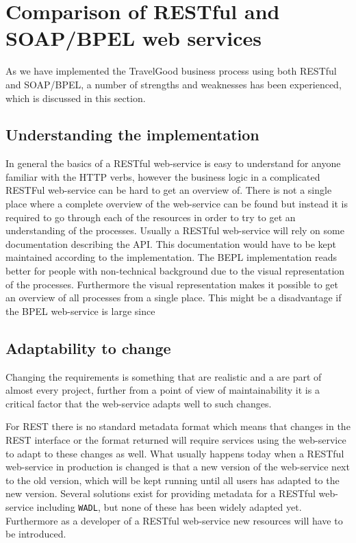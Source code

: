 {\setlength{\chapterfontsize}{26pt}
\chapter{Comparison of RESTful and SOAP/BPEL web services}
}

As we have implemented the TravelGood business process using both RESTful and SOAP/BPEL, a number of strengths and weaknesses has been experienced, which is discussed in this section. 


\section{Understanding the implementation}
In general the basics of a RESTful web-service is easy to understand for anyone familiar with the HTTP verbs, however the business logic in a complicated RESTFul web-service can be hard to get an overview of. There is not a single place where a complete overview of the web-service can be found but instead it is required to go through each of the resources in order to try to get an understanding of the processes. Usually a RESTful web-service will rely on some documentation describing the API. This documentation would have to be kept maintained according to the implementation. The BEPL implementation reads better for people with non-technical background due to the visual representation of the processes. Furthermore the visual representation makes it possible to get an overview of all processes from a single place. This might be a disadvantage if the BPEL web-service is large since 

\section{Adaptability to change}
Changing the requirements is something that are realistic and a are part of almost every project, further from a point of view of maintainability it is a critical factor that the web-service adapts well to such changes.

For REST there is no standard metadata format which means that changes in the REST interface or the format returned will require services using the web-service to adapt to these changes as well. What usually happens today when a RESTful web-service in production is changed is that a new version of the web-service next to the old version, which will be kept running until all users has adapted to the new version. Several solutions exist for providing metadata for a RESTful web-service including \texttt{WADL}, but none of these has been widely adapted yet. Furthermore as a developer of a RESTful web-service new resources will have to be introduced.

